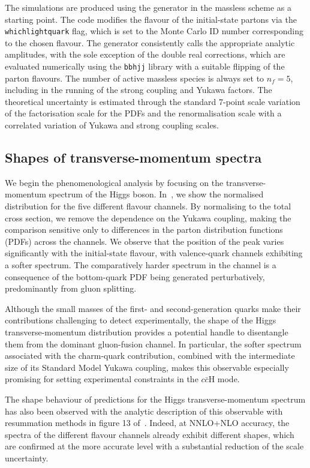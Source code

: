 \documentclass[11pt,a4paper]{article}
\begin{document}
The simulations are produced using the \minnlo{} \bbH{} generator in the massless scheme as a starting point. The code modifies the flavour of the initial-state partons via the \texttt{whichlightquark} flag, which is set to the Monte Carlo ID number corresponding to the chosen flavour. The generator consistently calls the appropriate analytic amplitudes, with the sole exception of the double real corrections, which are evaluated numerically using the \OpenLoops{} \texttt{bbhjj} library with a suitable flipping of the parton flavours. The number of active massless species is always set to \( n_f = 5 \), including in the running of the strong coupling and Yukawa factors. The theoretical uncertainty is estimated through the standard 7-point scale variation of the factorisation scale for the PDFs and the renormalisation scale with a correlated variation of Yukawa and strong coupling scales.

\subsection{Shapes of transverse-momentum spectra}
We begin the phenomenological analysis by focusing on the transverse-momentum spectrum of the Higgs boson. In~, we show the normalised distribution for the five different flavour channels. By normalising to the total cross section, we remove the dependence on the Yukawa coupling, making the comparison sensitive only to differences in the parton distribution functions (PDFs) across the channels. We observe that the position of the peak varies significantly with the initial-state flavour, with valence-quark channels exhibiting a softer spectrum. The comparatively harder spectrum in the \bbH{} channel is a consequence of the bottom-quark PDF being generated perturbatively, predominantly from gluon splitting.

Although the small masses of the first- and second-generation quarks make their contributions challenging to detect experimentally, the shape of the Higgs transverse-momentum distribution provides a potential handle to disentangle them from the dominant gluon-fusion channel. In particular, the softer spectrum associated with the charm-quark contribution, combined with the intermediate size of its Standard Model Yukawa coupling, makes this observable especially promising for setting experimental constraints in the $c\bar c \text{H}$ mode.

The shape behaviour of \minnlo{} predictions for the Higgs transverse-momentum spectrum has also been observed with the analytic description of this observable with resummation methods in figure 13 of~. Indeed, at NNLO+NLO accuracy, the spectra of the different flavour channels already exhibit different shapes, which are confirmed at the more accurate \nnnres{} level with a substantial reduction of the scale uncertainty.
\end{document}
